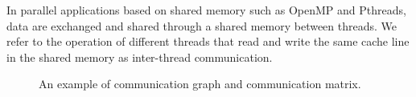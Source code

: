 \documentclass[a4paper,fleqn]{cas-sc}
\begin{document}
In parallel applications based on shared memory such as OpenMP and Pthreads, data are exchanged and shared through a shared memory between threads. We refer to the operation of different threads that read and write the same cache line in the shared memory as inter-thread communication.
\begin{figure}[htbp] 
	\centering	
	\centering
	\caption{An example of communication graph and communication matrix.} \label{FIG:1}
\end{figure}
\end{document}
